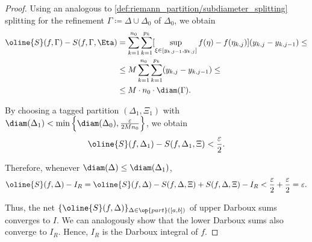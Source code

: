 \begin{proof}
  Using an analogous to \eqref{def:riemann_partition/subdiameter_splitting} splitting for the refinement \( \Gamma \coloneqq \Delta \cup \Delta_0 \) of \( \Delta_0 \), we obtain
  \begin{align*}
    \oline{S}(f, \Gamma) - S(f, \Gamma, \Eta)
    &=
    \sum_{k=1}^{n_0} \sum_{k=1}^{p_k} [ \sup_{\xi \in [y_{k,j-1}, y_{k,j}]} f(\eta) - f(\eta_{k,j}) ] (y_{k,j} - y_{k,j-1})
    \leq \\ &\leq
    M \sum_{k=1}^{n_0} \sum_{k=1}^{p_k} (y_{k,j} - y_{k,j-1})
    \leq \\ &\leq
    M \cdot n_0 \cdot \diam(\Gamma).
  \end{align*}

  By choosing a tagged partition \( (\Delta_1, \Xi_1) \) with \( \diam(\Delta_1) < \min \left\{ \diam(\Delta_0), \frac \varepsilon {2 M n_0} \right\} \), we obtain
  \begin{equation*}
    \oline{S}(f, \Delta_1) - S(f, \Delta_1, \Xi) < \frac \varepsilon 2.
  \end{equation*}

  Therefore, whenever \( \diam(\Delta) \leq \diam(\Delta_1) \),
  \begin{equation*}
    \oline{S}(f, \Delta) - I_R
    =
    \oline{S}(f, \Delta) - S(f, \Delta, \Xi) + S(f, \Delta, \Xi) - I_R
    <
    \frac \varepsilon 2 + \frac \varepsilon 2
    =
    \varepsilon.
  \end{equation*}

  Thus, the net \( \{ \oline{S}(f, \Delta) \}_{\Delta \in \op{part}([a, b])} \) of upper Darboux sums converges to \( I \). We can analogously show that the lower Darboux sums also converge to \( I_R \). Hence, \( I_R \) is the Darboux integral of \( f \).
\end{proof}

